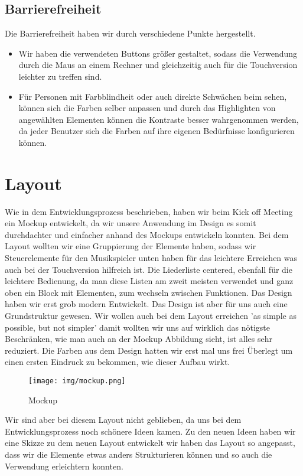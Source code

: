 \documentclass{article}
\begin{document}
\subsection{Barrierefreiheit}
Die Barrierefreiheit haben wir durch verschiedene Punkte hergestellt. 
\begin{itemize}
    \item Wir haben die verwendeten Buttons größer gestaltet, sodass die Verwendung durch die Maus an einem Rechner und gleichzeitig auch für die Touchversion leichter zu treffen sind.
    \item Für Personen mit Farbblindheit oder auch direkte Schwächen beim sehen, können sich die Farben selber anpassen und durch das Highlighten von angewählten Elementen können die Kontraste besser wahrgenommen werden, da jeder Benutzer sich die Farben auf ihre eigenen Bedürfnisse konfigurieren können.
\end{itemize}

\section{Layout}
Wie in dem Entwicklungsprozess beschrieben, haben wir beim Kick off Meeting ein Mockup entwickelt, da wir unsere Anwendung im Design es somit durchdachter und einfacher anhand des Mockups entwickeln konnten. Bei dem Layout wollten wir eine Gruppierung der Elemente haben, sodass wir Steuerelemente für den Musikspieler unten haben für das leichtere Erreichen was auch bei der Touchversion hilfreich ist. Die Liederliste centered, ebenfall für die leichtere Bedienung, da man diese Listen am zweit meisten verwendet und ganz oben ein Block mit Elementen, zum wechseln zwischen Funktionen. Das Design haben wir erst grob modern Entwickelt. Das Design ist aber für uns auch eine Grundstruktur gewesen. Wir wollen auch bei dem Layout erreichen 'as simple as possible, but not simpler' damit wollten wir uns auf wirklich das nötigste Beschränken, wie man auch an der Mockup Abbildung sieht, ist alles sehr reduziert. Die Farben aus dem Design hatten wir erst mal uns frei Überlegt um einen ersten Eindruck zu bekommen, wie dieser Aufbau wirkt.\\

\begin{figure}[H]
 \centering
 \texttt{[image: img/mockup.png]}
 \caption{Mockup}
 \label{fig:mockup}
\end{figure}

\noindent Wir sind aber bei diesem Layout nicht geblieben, da uns bei dem Entwicklungsprozess noch schönere Ideen kamen. Zu den neuen Ideen haben wir eine Skizze zu dem neuen Layout entwickelt wir haben das Layout so angepasst, dass wir die Elemente etwas anders Strukturieren können und so auch die Verwendung erleichtern konnten.\\
\end{document}
